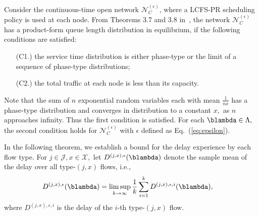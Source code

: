 Consider the continuous-time open network $\mathcal{N}_{C}^{(\epsilon)}$,
where a LCFS-PR scheduling policy is used at each node. From Theorems
$3.7$ and $3.8$ in~\cite{kelly1979reversibility}, the network $\mathcal{N}_{C}^{(\epsilon)}$ has a product-form queue length distribution in equilibrium, if the
following conditions are satisfied: 
\begin{enumerate}
\item[(C1.)] the service time distribution is either phase-type or the limit of
a sequence of phase-type distributions; 
\item[(C2.)] the total traffic at each node is less than its capacity. 
\end{enumerate}
Note that the sum of $n$ exponential random variables each with mean
$\frac{1}{nx}$ has a phase-type distribution and converges in distribution
to a constant $x,$ as $ n $ approaches infinity. Thus the first condition
is satisfied. For each $\blambda\in\Lambda,$ the second condition
holds for $\mathcal{N}_{C}^{(\epsilon)}$ with $\epsilon$ defined
as Eq.\ (\ref{eq:epsilon}).

In the following theorem, we establish a bound for the delay
experience by each flow type. For $j\in\mathcal{J},x\in\mathcal{X},$ let $D^{(j,x),\epsilon} (\blambda)$ denote the sample
mean of the delay over all type-$(j,x)$ flows, i.e.,
\begin{align*}
D^{(j,x),\epsilon} (\blambda) & =\limsup_{k\rightarrow\infty}\frac{1}{k}\sum_{i=1}^{k}D^{(j,x),\epsilon,i} (\blambda),
\end{align*}
where $D^{(j,x),\epsilon,i}$ is the delay of the $i$-th type-$(j,x)$ flow.

